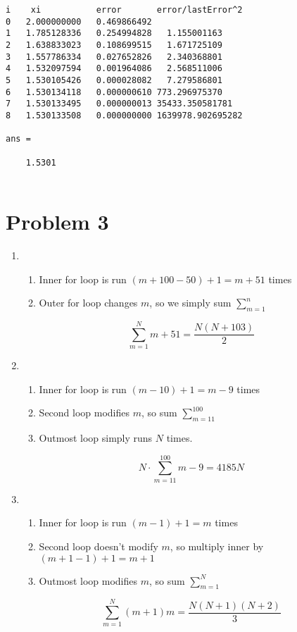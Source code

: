\documentclass{article}
\begin{document}
\begin{lstlisting}
i 	 xi           error       error/lastError^2
0   2.000000000   0.469866492
1   1.785128336   0.254994828   1.155001163
2   1.638833023   0.108699515   1.671725109
3   1.557786334   0.027652826   2.340368801
4   1.532097594   0.001964086   2.568511006
5   1.530105426   0.000028082   7.279586801
6   1.530134118   0.000000610 773.296975370
7   1.530133495   0.000000013 35433.350581781
8   1.530133508   0.000000000 1639978.902695282

ans =

    1.5301
    
\end{lstlisting}\pagebreak

\section*{Problem 3}
\begin{enumerate}[label=(\alph*)]
    \item \begin{enumerate}[label=\arabic*.]
        \item Inner for loop is run \((m + 100 - 50) + 1 = m + 51\) times
        \item Outer for loop changes \(m\), so we simply sum \(\sum_{m=1}^{n}\)
    \end{enumerate}
    \begin{equation*}
        \sum_{m=1}^{N}m+51 = \frac{N(N + 103)}{2}
    \end{equation*}
    \item \begin{enumerate}[label=\arabic*.]
        \item Inner for loop is run \((m - 10) + 1 = m - 9\) times
        \item Second loop modifies \(m\), so sum \(\sum_{m=11}^{100}\)
        \item Outmost loop simply runs \(N\) times.
    \end{enumerate}
    \begin{equation*}
        N\cdot\sum_{m=11}^{100}{m-9} = 4185N
    \end{equation*}
    \item \begin{enumerate}[label=\arabic*.]
        \item Inner for loop is run \((m - 1) + 1 = m\) times
        \item Second loop doesn't modify \(m\), so multiply inner by \((m + 1 - 1) + 1 = m + 1\)
        \item Outmost loop modifies \(m\), so sum \(\sum_{m=1}^{N}\)
    \end{enumerate}
    \begin{equation*}
        \sum_{m=1}^{N}{(m+1)m} = \frac{N(N+1)(N+2)}{3}
    \end{equation*}
\end{enumerate}
\end{document}

